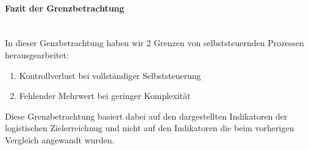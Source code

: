 \clearpage
\paragraph{Fazit der Grenzbetrachtung}\mbox{}\\

In dieser Genzbetrachtung haben wir 2 Grenzen von selbststeuernden Prozessen
herausgearbeitet:

\begin{enumerate}
  \item Kontrollverlust bei vollständiger Selbststeuerung
  \item Fehlender Mehrwert bei geringer Komplexität
\end{enumerate}

Diese Grenzbetrachtung basiert dabei auf den dargestellten Indikatoren der logistischen
Zielerreichnug und nicht auf den Indikatoren die beim vorherigen Vergleich angewandt wurden.




% 
% 
% 